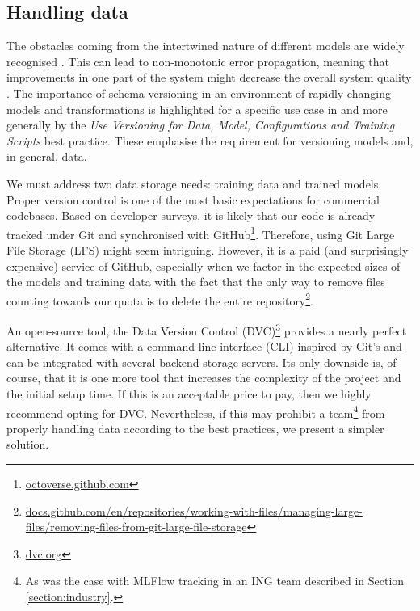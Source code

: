 \subsection{Handling data} \label{subsection:large-file}

The obstacles coming from the intertwined nature of different models are widely recognised \cite{haakman2021ai,amershi2019software,sculley2015hidden}. This can lead to non-monotonic error propagation, meaning that improvements in one part of the system might decrease the overall system quality \cite{amershi2019software}. The importance of schema versioning in an environment of rapidly changing models and transformations is highlighted for a specific use case in \cite{van2017versioning} and more generally by the \textit{Use Versioning for Data, Model, Configurations and Training Scripts} best practice. These emphasise the requirement for versioning models and, in general, data.

We must address two data storage needs: training data and trained models. Proper version control is one of the most basic expectations for commercial codebases. Based on developer surveys, it is likely that our code is already tracked under Git and synchronised with GitHub\footnote{\href{https://octoverse.github.com/\#lets-look-back-at-the-code-and-communities-built-on-git-hub-this-year}{octoverse.github.com}}. Therefore, using Git Large File Storage (LFS) might seem intriguing. However, it is a paid (and surprisingly expensive) service of GitHub, especially when we factor in the expected sizes of the models and training data with the fact that the only way to remove files counting towards our quota is to delete the entire repository\footnote{\href{https://docs.github.com/en/repositories/working-with-files/managing-large-files/removing-files-from-git-large-file-storage\#git-lfs-objects-in-your-repository}{docs.github.com/en/repositories/working-with-files/managing-large-files/removing-files-from-git-large-file-storage}}.

An open-source tool, the Data Version Control (DVC)\footnote{\href{https://dvc.org/}{dvc.org}} provides a nearly perfect alternative. It comes with a command-line interface (CLI) inspired by Git's and can be integrated with several backend storage servers. Its only downside is, of course, that it is one more tool that increases the complexity of the project and the initial setup time. If this is an acceptable price to pay, then we highly recommend opting for DVC. Nevertheless, if this may prohibit a team\footnote{As was the case with MLFlow tracking in an ING team described in Section \ref{section:industry}.} from properly handling data according to the best practices, we present a simpler solution.

